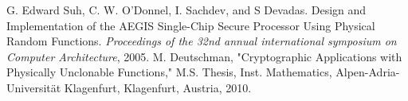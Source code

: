 \documentclass[letterpaper, 10 pt, conference]{ieeeconf}  %
\begin{document}
\begin{thebibliography}{99}

 G. Edward Suh, C. W. O'Donnel, I. Sachdev, and S Devadas. Design and Implementation of the AEGIS Single-Chip Secure Processor Using Physical Random Functions. \emph{Proceedings of the 32nd annual international symposium on Computer Architecture}, 2005.
 M. Deutschman, "Cryptographic Applications with Physically Unclonable Functions," M.S. Thesis, Inst. Mathematics, Alpen-Adria-Universit\"{a}t Klagenfurt, Klagenfurt, Austria, 2010.
 

\end{thebibliography}
\end{document}
